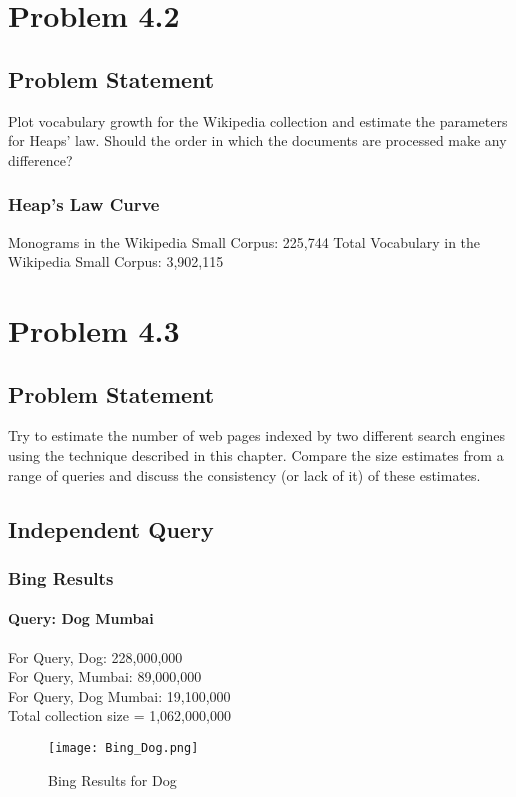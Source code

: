 \documentclass[12pt]{report}
\begin{document}
\chapter{Problem 4.2}
\section{Problem Statement}
Plot vocabulary growth for the Wikipedia collection and estimate the parameters for Heaps’ law. Should the order in which the documents are processed make any difference?
\subsection{Heap's Law Curve}

Monograms in the Wikipedia Small Corpus: 225,744
Total Vocabulary in the Wikipedia Small Corpus: 3,902,115


\chapter{Problem 4.3}
\section{Problem Statement}
Try to estimate the number of web pages indexed by two different search engines using the technique described in this chapter. Compare the size estimates from a range of queries and discuss the consistency (or lack of it) of these estimates. 
\section{Independent Query}
\subsection{Bing Results}
\subsubsection{Query: Dog Mumbai}
For Query, Dog: 228,000,000\\
For Query, Mumbai: 89,000,000\\
For Query, Dog Mumbai: 19,100,000\\

Total collection size = 1,062,000,000\\

\begin{figure}[ht] 
  \centering
  \texttt{[image: Bing\_Dog.png]}
  \caption{Bing Results for Dog}
  \label{fig:1}
\end{figure}
\end{document}

